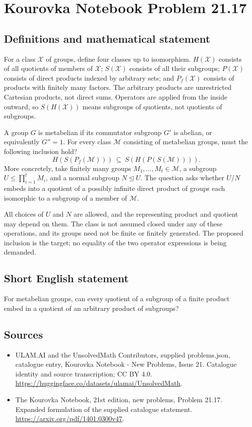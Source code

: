 \documentclass[11pt,a4paper]{article}
\begin{document}
\section*{Kourovka Notebook Problem 21.17}\label{statement}

\subsection{Definitions and mathematical statement}
For a class $\mathcal X$ of groups, define four classes up to isomorphism.
$H(\mathcal X)$ consists of all quotients of members of $\mathcal X$;
$S(\mathcal X)$ consists of all their subgroups; $P(\mathcal X)$ consists
of direct products indexed by arbitrary sets; and $P_f(\mathcal X)$
consists of products with finitely many factors. The arbitrary products
are unrestricted Cartesian products, not direct sums. Operators are
applied from the inside outward, so $S(H(\mathcal X))$ means subgroups
of quotients, not quotients of subgroups.

A group $G$ is metabelian if its commutator subgroup $G'$ is abelian,
or equivalently $G''=1$. For every class $\mathcal M$ consisting of
metabelian groups, must the following inclusion hold?
\[
 H(S(P_f(\mathcal M)))\ \subseteq\ S(H(P(S(\mathcal M)))).
\]
More concretely, take finitely many groups $M_1,\ldots,M_t\in\mathcal M$,
a subgroup $U\le\prod_{i=1}^tM_i$, and a normal subgroup $N\trianglelefteq U$.
The question asks whether $U/N$ embeds into a quotient of a possibly
infinite direct product of groups each isomorphic to a subgroup of a
member of $\mathcal M$.

All choices of $U$ and $N$ are allowed, and the representing product
and quotient may depend on them. The class is not assumed closed under
any of these operations, and its groups need not be finite or finitely
generated. The proposed inclusion is the target; no equality of the
two operator expressions is being demanded.
\subsection{Short English statement}
For metabelian groups, can every quotient of a subgroup of a finite product embed in a quotient of an arbitrary product of subgroups?
\subsection{Sources}
\begin{itemize}
\item[S1] ULAM.AI and the UnsolvedMath Contributors, supplied problems.json, catalogue entry, Kourovka Notebook - New Problems, Issue 21. Catalogue identity and source transcription; CC BY 4.0.
\url{https://huggingface.co/datasets/ulamai/UnsolvedMath}.
\item[S2] The Kourovka Notebook, 21st edition, new problems, Problem 21.17. Expanded formulation of the supplied catalogue statement.
\url{https://arxiv.org/pdf/1401.0300v47}.
\end{itemize}
\end{document}
